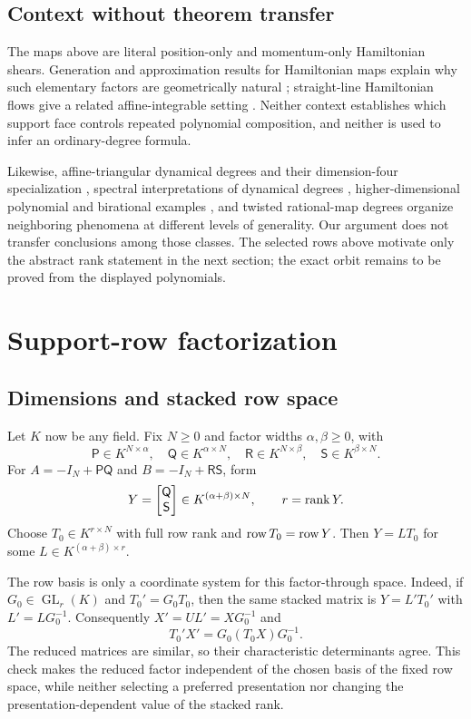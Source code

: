\documentclass[11pt,letterpaper]{article}
\theoremstyle{plain}
\begin{document}
\subsection{Context without theorem transfer}

The maps above are literal position-only and momentum-only Hamiltonian shears.  Generation and approximation results for Hamiltonian maps explain why such elementary factors are geometrically natural \cite{BT}; straight-line Hamiltonian flows give a related affine-integrable setting \cite{KL}.  Neither context establishes which support face controls repeated polynomial composition, and neither is used to infer an ordinary-degree formula.

Likewise, affine-triangular dynamical degrees and their dimension-four specialization \cite{BvS,SS}, spectral interpretations of dynamical degrees \cite{DF}, higher-dimensional polynomial and birational examples \cite{Des}, and twisted rational-map degrees \cite{AX} organize neighboring phenomena at different levels of generality.  Our argument does not transfer conclusions among those classes.  The selected rows above motivate only the abstract rank statement in the next section; the exact orbit remains to be proved from the displayed polynomials.

\section{Support-row factorization}
\label{sec:rank}

\subsection{Dimensions and stacked row space}

Let $K$ now be any field.  Fix $N\geq0$ and factor widths $\alpha,\beta\geq0$, with
\[
\mathsf P\in K^{N\times\alpha},\quad
\mathsf Q\in K^{\alpha\times N},\quad
\mathsf R\in K^{N\times\beta},\quad
\mathsf S\in K^{\beta\times N}.
\]
For $A=-I_N+\mathsf P\mathsf Q$ and $B=-I_N+\mathsf R\mathsf S$, form
\[
Y=\begin{bmatrix}\mathsf Q\\ \mathsf S\end{bmatrix}
\in K^{(\alpha+\beta)\times N},\qquad r=\operatorname{rank} Y.
\]
Choose $T_0\in K^{r\times N}$ with full row rank and $\operatorname{row} T_0=\operatorname{row} Y$.  Then $Y=LT_0$ for some $L\in K^{(\alpha+\beta)\times r}$.

The row basis is only a coordinate system for this factor-through space.  Indeed, if \(G_0\in\operatorname{GL}_r(K)\) and \(T_0'=G_0T_0\), then the same stacked matrix is \(Y=L'T_0'\) with \(L'=LG_0^{-1}\).  Consequently \(X'=UL'=XG_0^{-1}\) and
\[
T_0'X'=G_0(T_0X)G_0^{-1}.
\]
The reduced matrices are similar, so their characteristic determinants agree.  This check makes the reduced factor independent of the chosen basis of the fixed row space, while neither selecting a preferred presentation nor changing the presentation-dependent value of the stacked rank.
\end{document}
